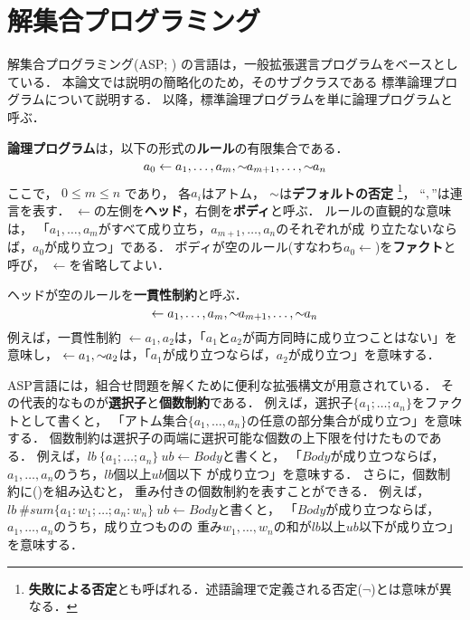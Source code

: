 \chapter{解集合プログラミング}\label{chap:asp}

解集合プログラミング(ASP; \cite{%
  Baral03:cambridge,%
  Gelfond88:iclp,%
  Niemela99:amai,%
  Inoue08:jssst})
の言語は，一般拡張選言プログラムをベースとしている．
本論文では説明の簡略化のため，そのサブクラスである
標準論理プログラムについて説明する．
以降，標準論理プログラムを単に論理プログラムと呼ぶ．

\textbf{論理プログラム}は，以下の形式の\textbf{ルール}の有限集合である．
\begin{equation}
  \label{eq:rule}
  a_0\leftarrow a_1,\dots,a_m,{\sim\!\!{a_{m+1}}},\dots,{\sim\!\!{a_n}}
\end{equation}
ここで，
$0\leq m\leq n$ であり，
各$a_i$はアトム，
${\sim\!\!{}}$は\textbf{デフォルトの否定}
\footnote{\textbf{失敗による否定}とも呼ばれる．述語論理で定義される否定($\neg$)とは意味が異なる．}，
``$,$''は連言を表す．
$\leftarrow$の左側を\textbf{ヘッド}，右側を\textbf{ボディ}と呼ぶ．
ルールの直観的な意味は，
「$a_1,\ldots,a_m$がすべて成り立ち，$a_{m+1},\ldots,a_n$のそれぞれが成
り立たないならば，$a_0$が成り立つ」である．
ボディが空のルール(すなわち\(a_0\leftarrow\))を\textbf{ファクト}と呼び，
$\leftarrow$を省略してよい．

ヘッドが空のルールを\textbf{一貫性制約}と呼ぶ．
\begin{equation}
  \label{eq:constr}
  \leftarrow a_1,\dots,a_m,{\sim\!\!{a_{m+1}}},\dots,{\sim\!\!{a_n}}
\end{equation}
例えば，一貫性制約
\(\leftarrow a_1,a_2\)は，「$a_1$と$a_2$が両方同時に成り立つことはない」を意味し，
\(\leftarrow a_1, {\sim\!\!{a_{2}}}\)は，「$a_1$が成り立つならば，$a_2$が成り立つ」を意味する．

ASP言語には，組合せ問題を解くために便利な拡張構文が用意されている．
その代表的なものが\textbf{選択子}と\textbf{個数制約}である．
例えば，選択子\(\{a_1;\dots;a_n\}\)をファクトとして書くと，
「アトム集合\(\{a_1,\dots,a_n\}\)の任意の部分集合が成り立つ」を意味する．
個数制約は選択子の両端に選択可能な個数の上下限を付けたものである．
例えば，\(lb\ \{a_1;\dots;a_n\}\ ub \leftarrow Body\)と書くと，
「$Body$が成り立つならば，$a_1,\dots,a_n$のうち，$lb$個以上$ub$個以下
が成り立つ」を意味する．
さらに，個数制約に()を組み込むと，
重み付きの個数制約を表すことができる．
例えば，\( lb\ \#sum \{a_1:w_1;\dots;a_n:w_n\}\ ub \leftarrow Body\)と書くと，
「$Body$が成り立つならば，$a_1,\dots,a_n$のうち，成り立つものの
重み$w_1,\dots,w_n$の和が$lb$以上$ub$以下が成り立つ」
を意味する．

